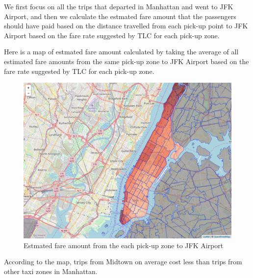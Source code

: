 \documentclass[12pt,twoside]{reedthesis}
\theoremstyle{definition}
\theoremstyle{definition}
\theoremstyle{definition}
\theoremstyle{remark}
\begin{document}
We first focus on all the trips that departed in Manhattan and went to
JFK Airport, and then we calculate the estmated fare amount that the
passengers should have paid based on the distance travelled from each
pick-up point to JFK Airport based on the fare rate suggested by TLC for
each pick-up zone.

Here is a map of estmated fare amount calculated by taking the average
of all estimated fare amounts from the same pick-up zone to JFK Airport
based on the fare rate suggested by TLC for each pick-up zone.
\begin{figure}

{\centering \includegraphics[width=4.96in]{figure/to_jkf_fare_vis} 

}

\caption{Estmated fare amount from the each pick-up zone to JFK Airport}\label{fig:to-jkf-fare-vis}
\end{figure}
According to the map, trips from Midtown on average cost less than trips
from other taxi zones in Manhattan.
\end{document}
